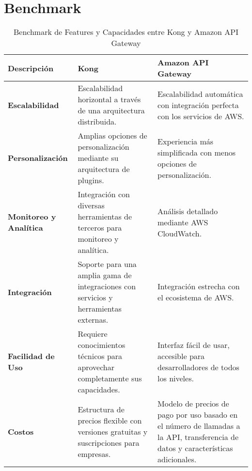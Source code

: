 \section{Benchmark}


\begin{table}[H]
\centering
\caption{Benchmark de Features y Capacidades entre Kong y Amazon API Gateway}
\label{tab:benchmark}
\begin{tabularx}{\linewidth}{|X|X|X|}
\toprule
\textbf{Descripción} & \textbf{Kong} & \textbf{Amazon API Gateway} \\
\midrule
\small \textbf{Escalabilidad} & \small Escalabilidad horizontal a través de una arquitectura distribuida. & \small Escalabilidad automática con integración perfecta con los servicios de AWS. \\
\midrule
\small \textbf{Personalización} & \small Amplias opciones de personalización mediante su arquitectura de plugins. & \small Experiencia más simplificada con menos opciones de personalización. \\
\midrule
\small \textbf{Monitoreo y Analítica} & \small Integración con diversas herramientas de terceros para monitoreo y analítica. & \small Análisis detallado mediante AWS CloudWatch. \\
\midrule
\small \textbf{Integración} & \small Soporte para una amplia gama de integraciones con servicios y herramientas externas. & \small Integración estrecha con el ecosistema de AWS. \\
\midrule
\textbf{Facilidad de Uso} & Requiere conocimientos técnicos para aprovechar completamente sus capacidades. & Interfaz fácil de usar, accesible para desarrolladores de todos los niveles. \\
\midrule
\textbf{Costos} & Estructura de precios flexible con versiones gratuitas y suscripciones para empresas. & Modelo de precios de pago por uso basado en el número de llamadas a la API, transferencia de datos y características adicionales. \\

\bottomrule
\end{tabularx}
\end{table}